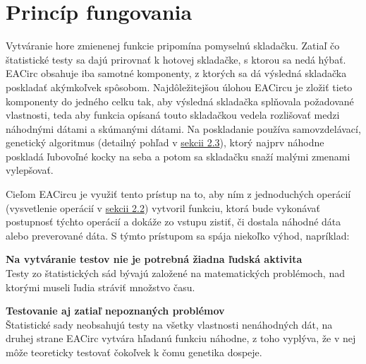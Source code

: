 \section{Princíp fungovania}
\label{sec:principle}

Vytváranie hore zmienenej funkcie pripomína pomyselnú skladačku. Zatiaľ čo štatistické testy sa dajú prirovnať k hotovej skladačke, s ktorou sa nedá hýbať. EACirc obsahuje iba samotné komponenty, z ktorých sa dá výsledná skladačka poskladať akýmkoľvek spôsobom. Najdôležitejšou úlohou EACircu je zložiť tieto komponenty do jedného celku tak, aby výsledná skladačka splňovala požadované vlastnosti, teda aby funkcia opísaná touto skladačkou vedela rozlišovať medzi náhodnými dátami a skúmanými dátami. Na poskladanie používa samovzdelávací, genetický algoritmus (detailný pohľad v \hyperref[sec:genetics]{sekcii 2.3}), ktorý najprv náhodne poskladá ľubovoľné kocky na seba a potom sa skladačku snaží malými zmenami vylepšovať.

Cieľom EACircu je využiť tento prístup na to, aby ním z jednoduchých operácií (vysvetlenie operácií v \hyperref[sec:nodes]{sekcii 2.2}) vytvoril funkciu, ktorá bude vykonávať postupnosť týchto operácií a dokáže zo vstupu zistiť, či dostala náhodné dáta alebo preverované dáta. S týmto prístupom sa spája niekoľko výhod, napríklad:
\begin{myItemize}
	\item \textbf{Na vytváranie testov nie je potrebná žiadna ľudská aktivita}\\Testy zo štatistických sád bývajú založené na matematických problémoch, nad ktorými museli ľudia stráviť množstvo času.
	\item \textbf{Testovanie aj zatiaľ nepoznaných problémov}\\Štatistické sady neobsahujú testy na všetky vlastnosti nenáhodných dát, na druhej strane EACirc vytvára hľadanú funkciu náhodne, z toho vyplýva, že v nej môže teoreticky testovať čokoľvek k čomu genetika dospeje.
\end{myItemize}


